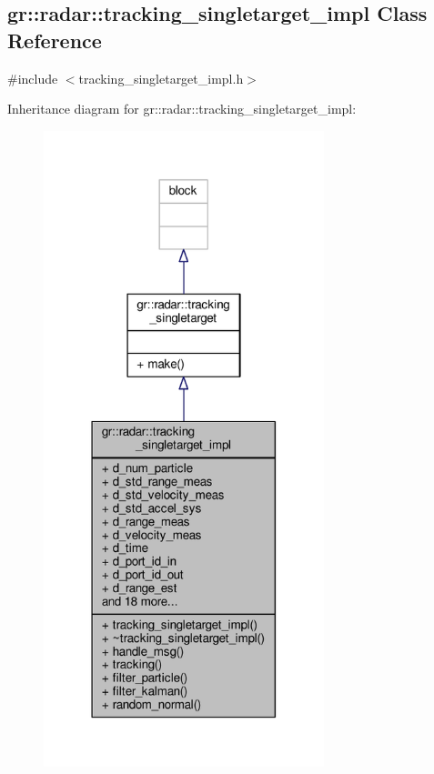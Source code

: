 \subsection{gr\+:\+:radar\+:\+:tracking\+\_\+singletarget\+\_\+impl Class Reference}
\label{classgr_1_1radar_1_1tracking__singletarget__impl}


{\ttfamily \#include $<$tracking\+\_\+singletarget\+\_\+impl.\+h$>$}



Inheritance diagram for gr\+:\+:radar\+:\+:tracking\+\_\+singletarget\+\_\+impl\+:
\nopagebreak
\begin{figure}[H]
\begin{center}
\leavevmode
\includegraphics[width=231pt]{dc/de8/classgr_1_1radar_1_1tracking__singletarget__impl__inherit__graph}
\end{center}
\end{figure}


